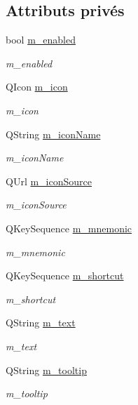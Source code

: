 \subsection*{Attributs privés}
\begin{DoxyCompactItemize}
\item 
bool \hyperlink{classSimpleHotel_1_1SH__ExtendedQQmlAction_a412f551872a7daf02e03336740e7d74e}{m\-\_\-enabled}
\begin{DoxyCompactList}\small\item\em m\-\_\-enabled \end{DoxyCompactList}\item 
Q\-Icon \hyperlink{classSimpleHotel_1_1SH__ExtendedQQmlAction_ae750e9357ebb9599138b8f33e5dc4c74}{m\-\_\-icon}
\begin{DoxyCompactList}\small\item\em m\-\_\-icon \end{DoxyCompactList}\item 
Q\-String \hyperlink{classSimpleHotel_1_1SH__ExtendedQQmlAction_a8fce5a42c750f051070411e0aa394b6b}{m\-\_\-icon\-Name}
\begin{DoxyCompactList}\small\item\em m\-\_\-icon\-Name \end{DoxyCompactList}\item 
Q\-Url \hyperlink{classSimpleHotel_1_1SH__ExtendedQQmlAction_a35a70eacc9b4d0873bd11d50aee5511f}{m\-\_\-icon\-Source}
\begin{DoxyCompactList}\small\item\em m\-\_\-icon\-Source \end{DoxyCompactList}\item 
Q\-Key\-Sequence \hyperlink{classSimpleHotel_1_1SH__ExtendedQQmlAction_aef951bbe65264f4e650e98b4449fbe48}{m\-\_\-mnemonic}
\begin{DoxyCompactList}\small\item\em m\-\_\-mnemonic \end{DoxyCompactList}\item 
Q\-Key\-Sequence \hyperlink{classSimpleHotel_1_1SH__ExtendedQQmlAction_a5522e6467ee3d0a8b7dc22a70497564c}{m\-\_\-shortcut}
\begin{DoxyCompactList}\small\item\em m\-\_\-shortcut \end{DoxyCompactList}\item 
Q\-String \hyperlink{classSimpleHotel_1_1SH__ExtendedQQmlAction_a016b946c3a6c27e759e541ced2357caa}{m\-\_\-text}
\begin{DoxyCompactList}\small\item\em m\-\_\-text \end{DoxyCompactList}\item 
Q\-String \hyperlink{classSimpleHotel_1_1SH__ExtendedQQmlAction_ac8031b4c01e3dde52765d4ed1d607951}{m\-\_\-tooltip}
\begin{DoxyCompactList}\small\item\em m\-\_\-tooltip \end{DoxyCompactList}\end{DoxyCompactItemize}


